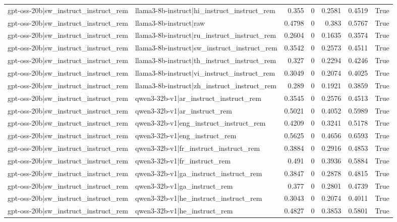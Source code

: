 \begin{table}
\begin{tabular}{l l r r r r l}
gpt-oss-20b|sw_instruct_instruct_rem & llama3-8b-instruct|hi_instruct_instruct_rem & 0.355 & 0 & 0.2581 & 0.4519 & True \\
gpt-oss-20b|sw_instruct_instruct_rem & llama3-8b-instruct|raw & 0.4798 & 0 & 0.383 & 0.5767 & True \\
gpt-oss-20b|sw_instruct_instruct_rem & llama3-8b-instruct|ru_instruct_instruct_rem & 0.2604 & 0 & 0.1635 & 0.3574 & True \\
gpt-oss-20b|sw_instruct_instruct_rem & llama3-8b-instruct|sw_instruct_instruct_rem & 0.3542 & 0 & 0.2573 & 0.4511 & True \\
gpt-oss-20b|sw_instruct_instruct_rem & llama3-8b-instruct|th_instruct_instruct_rem & 0.327 & 0 & 0.2294 & 0.4246 & True \\
gpt-oss-20b|sw_instruct_instruct_rem & llama3-8b-instruct|vi_instruct_instruct_rem & 0.3049 & 0 & 0.2074 & 0.4025 & True \\
gpt-oss-20b|sw_instruct_instruct_rem & llama3-8b-instruct|zh_instruct_instruct_rem & 0.289 & 0 & 0.1921 & 0.3859 & True \\
gpt-oss-20b|sw_instruct_instruct_rem & qwen3-32b-v1|ar_instruct_instruct_rem & 0.3545 & 0 & 0.2576 & 0.4513 & True \\
gpt-oss-20b|sw_instruct_instruct_rem & qwen3-32b-v1|ar_instruct_rem & 0.5021 & 0 & 0.4052 & 0.5989 & True \\
gpt-oss-20b|sw_instruct_instruct_rem & qwen3-32b-v1|eng_instruct_instruct_rem & 0.4209 & 0 & 0.3241 & 0.5178 & True \\
gpt-oss-20b|sw_instruct_instruct_rem & qwen3-32b-v1|eng_instruct_rem & 0.5625 & 0 & 0.4656 & 0.6593 & True \\
gpt-oss-20b|sw_instruct_instruct_rem & qwen3-32b-v1|fr_instruct_instruct_rem & 0.3884 & 0 & 0.2916 & 0.4853 & True \\
gpt-oss-20b|sw_instruct_instruct_rem & qwen3-32b-v1|fr_instruct_rem & 0.491 & 0 & 0.3936 & 0.5884 & True \\
gpt-oss-20b|sw_instruct_instruct_rem & qwen3-32b-v1|ga_instruct_instruct_rem & 0.3847 & 0 & 0.2878 & 0.4815 & True \\
gpt-oss-20b|sw_instruct_instruct_rem & qwen3-32b-v1|ga_instruct_rem & 0.377 & 0 & 0.2801 & 0.4739 & True \\
gpt-oss-20b|sw_instruct_instruct_rem & qwen3-32b-v1|he_instruct_instruct_rem & 0.3043 & 0 & 0.2074 & 0.4011 & True \\
gpt-oss-20b|sw_instruct_instruct_rem & qwen3-32b-v1|he_instruct_rem & 0.4827 & 0 & 0.3853 & 0.5801 & True \\

\end{tabular}
\end{table}
